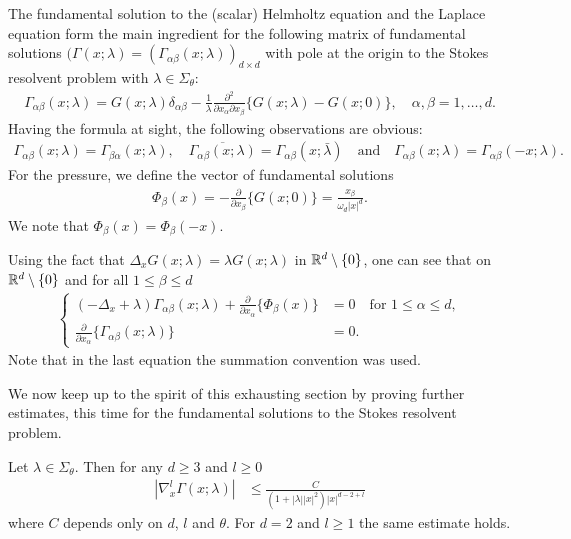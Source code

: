   The fundamental solution to the (scalar) Helmholtz equation and the Laplace equation form the main ingredient for the following matrix of fundamental solutions $(\Gamma(x;\lambda) = (\Gamma_{\alpha\beta}(x;\lambda))_{d \times d}$ with pole at the origin to the Stokes resolvent problem with $\lambda \in \Sigma_\theta$:
  \begin{align}
    \label{eq:fundamentalMatrixStokes}
    \Gamma_{\alpha\beta}(x;\lambda) = G(x; \lambda) \delta_{\alpha\beta} - \frac{1}{\lambda} \frac{\partial^2}{\partial x_\alpha \partial x_\beta} \{ G(x; \lambda) - G(x; 0) \}, \quad \alpha,\beta = 1,\dots,d.
  \end{align}
  Having the formula at sight, the following observations are obvious:
  \begin{align*}
    \Gamma_{\alpha\beta}(x; \lambda) = \Gamma_{\beta\alpha}(x; \lambda), \quad 
    \overline{\Gamma_{\alpha\beta}(x; \lambda)} = \Gamma_{\alpha\beta}(x; \bar\lambda)
    \quad\text{and}\quad
    \Gamma_{\alpha\beta}(x; \lambda) = \Gamma_{\alpha\beta}(-x; \lambda).
  \end{align*}
  For the pressure, we define the vector of fundamental solutions
  \begin{align}
    \label{eq:fundamentalVectorPressure}
      \Phi_\beta(x) = -\frac{\partial}{\partial x_\beta} \{ G(x; 0) \} = \frac{x_\beta}{\omega_d |x|^d}.
  \end{align}
  We note that $\Phi_\beta(x) = \Phi_\beta(-x)$.

  Using the fact that $\Delta_x G(x; \lambda) = \lambda G(x; \lambda)$ in $\mathbb{R}^d \setminus \{0\}$, one can see that on $\mathbb{R}^d \setminus \{0\}$ and for all $1 \leq \beta \leq d$
  \begin{align}
    \label{eq:solutionStokesSystem}
    \begin{cases}
      (-\Delta_x + \lambda) \Gamma_{\alpha\beta}(x;\lambda) + \frac{\partial}{\partial x_\alpha} \{ \Phi_\beta(x) \} &= 0 \quad\text{for } 1 \leq \alpha \leq d, \\
      \frac{\partial}{\partial x_\alpha} \{ \Gamma_{\alpha\beta} (x; \lambda) \} &= 0.
    \end{cases}
  \end{align}
  Note that in the last equation the summation convention was used.

  We now keep up to the spirit of this exhausting section by proving further estimates, this time for the fundamental solutions to the Stokes resolvent problem.

  \begin{thm}
    \label{thm:fundamentalMatrixEstimate}
    Let $\lambda \in \Sigma_\theta$.
    Then for any $d \geq 3$ and $l \geq 0$
    \begin{align}
      \label{eq:fundamentalMatrixEstimate}
      | \nabla_x^l \Gamma(x; \lambda) | &\leq \frac{C}{(1 + |\lambda||x|^2) |x|^{d - 2 + l}} 
    \end{align}
      where $C$ depends only on $d$, $l$ and $\theta$. For $d = 2$ and $l \geq 1$ the same estimate holds.
  \end{thm}

